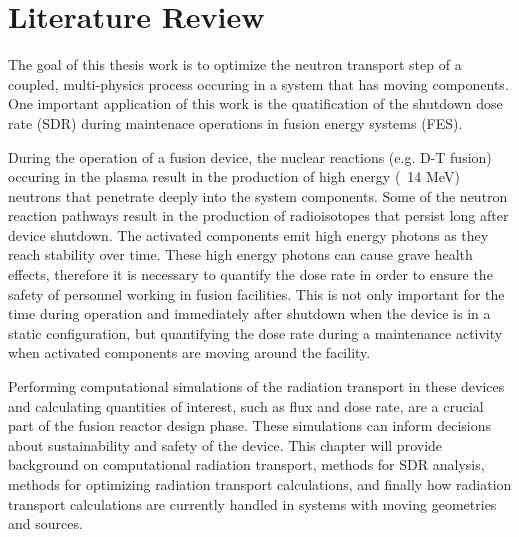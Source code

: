 \chapter{Literature Review} \label{ch:litrev}

The goal of this thesis work is to optimize the neutron transport step of a
coupled, multi-physics process occuring in a system that has moving components.  One
important application of this work is the quatification of the shutdown dose
rate (SDR) during maintenace operations in fusion energy systems (FES).

During the operation of a fusion device, the nuclear reactions (e.g. D-T
fusion) occuring in the plasma result in the production of high energy (~14 MeV) neutrons
that penetrate deeply into the system components.  Some of the neutron reaction
pathways result in the production of radioisotopes that persist long after
device shutdown.  The activated components emit high energy photons as they
reach stability over time.  These high energy photons
can cause grave health effects, therefore it is necessary to     
quantify the dose rate in order to ensure the safety of personnel working in
fusion facilities.  This is not only important for the time during operation
and immediately after shutdown when the device is in a static configuration,
but quantifying the dose rate during a maintenance activity when activated
components are moving around the facility.

Performing computational simulations of the radiation transport in these
devices and calculating quantities of interest, such as flux and dose rate, are
a crucial part of the fusion reactor design phase.  These simulations can
inform decisions about sustainability and safety of the device.  
This chapter will provide background on computational radiation
transport, methods for SDR analysis, methods for optimizing radiation transport
calculations, and finally  how radiation transport calculations are currently
handled in systems with moving geometries and sources.





